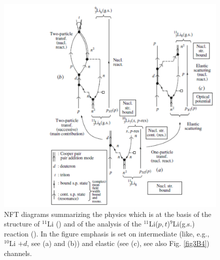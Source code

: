 \begin{figure}
\centerline{\includegraphics*[width=15cm,angle=0]{nutshell/figs/fig3B3.pdf}}
\caption{NFT diagrams summarizing the physics which is at the basis of the structure of $^{11}$Li (\cite{Barranco:01}) and of the analysis of the
$^{11}$Li($p, t$)$^{9}$Li(g.s.) reaction (\cite{Potel:10}). In the figure emphasis is
set on intermediate (like, e.g., $^{10}$Li $+d$, see (a) and (b)) and elastic (see (c), see also Fig. \ref{fig3B4}) channels.}\label{fig3B3}
\end{figure}
